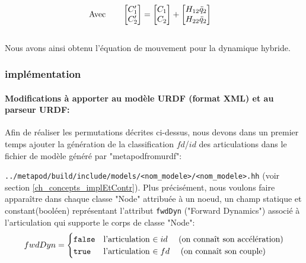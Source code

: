 \documentclass{report}
\begin{document}
\begin{align}
&\textnormal{Avec} \qquad
\begin{bmatrix}
  C'_{1} \\
  C'_{2}
\end{bmatrix}
=
\begin{bmatrix}
  C_{1} \\
  C_{2}
\end{bmatrix}
+
\begin{bmatrix}
  H_{12} \ddot{q}_2 \\
  H_{22} \ddot{q}_2
\end{bmatrix}
\end{align}
\\
Nous avons ainsi obtenu l'équation de mouvement pour la dynamique hybride.

\subsubsection{implémentation} \label{ch_implURDF}

\paragraph{Modifications à apporter au modèle URDF (format XML) et au parseur URDF:}

Afin de réaliser les permutations décrites ci-dessus, nous devons dans un premier temps ajouter la génération de la classification $fd$/$id$ des articulations dans le fichier de modèle généré par "metapodfromurdf":

\noindent
\verb;../metapod/build/include/models/<nom_modele>/<nom_modele>.hh; (voir section \ref{ch_concepts_implEtContr}). Plus précisément, nous voulons faire apparaître dans chaque classe "Node" attribuée à un noeud, un champ statique et constant\footnotemark[1] (booléen) représentant l'attribut \verb;fwdDyn; ("Forward Dynamics") associé à l'articulation qui supporte le corps de classe "Node":
\begin{equation*}
fwdDyn = 
\begin{cases}
  \verb;false; & \textnormal{l'articulation $\in id \quad$ (on connaît son accélération)} \\
  \verb;true; & \textnormal{l'articulation $\in fd \quad$ (on connaît son couple)}
\end{cases}
\end{equation*}

\end{document}
